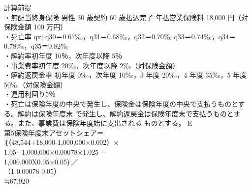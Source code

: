 \documentclass[report,gutter=10mm,fore-edge=10mm,uplatex,dvipdfmx]{jlreq}
\begin{document}
\noindent
計算前提\\
・無配当終身保険 男性
30 歳契約 60 歳払込完了
年払営業保険料 18,000 円（対保険金額 100 万円）\\
・死亡率 qx; q30＝0.67‰，q31＝0.68‰，q32＝0.70‰ q33＝0.74‰，q34＝0.78‰，q35＝0.82‰\\
・解約率初年度 10％，次年度以降 5％\\
・事業費率初年度 20‰，次年度以降 2‰（対保険金額）\\
・解約返戻金率 初年度 0‰，次年度 10‰，3 年度 20‰，4 年度 35‰，5 年度 50‰（対保険金額）\\
・運用利回り5％\\
・死亡は保険年度の中央で発生し、保険金は保険年度の中央で支払うものとする。解約は保険年度末
で発生し、解約返戻金は保険年度末で支払うものとする。また、事業費は保険年度始に支出される
ものとする。
\answer{}
E\\
第5保険年度末アセットシェア＝\\
｛（48,544+18,000-1,000,000×0.002）×\\
1.05−1,000,000×0.00078×1.025 −\\
1,000,000X0.05×0.05｝／\\
（1-0.00078-0.05）\\
≒67,920
\end{document}
